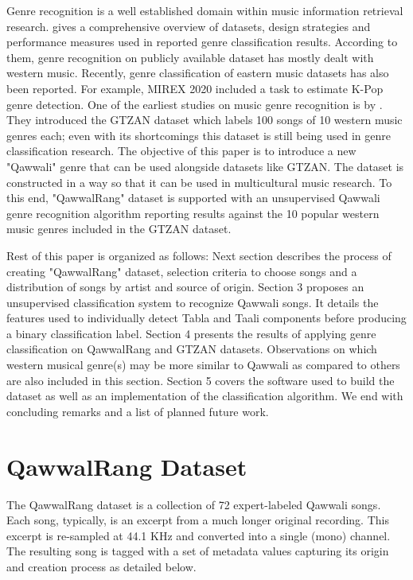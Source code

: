 \documentclass{article}
\begin{document}
Genre recognition is a well established domain within music information retrieval research. \cite{music_genre_survey} gives a comprehensive overview of datasets, design strategies and performance measures used in reported genre classification results. According to them, genre recognition on publicly available dataset has mostly dealt with western music. Recently, genre classification of eastern music datasets has also been reported. For example, MIREX 2020 \citep{mirex} included a task to estimate K-Pop genre detection. One of the earliest studies on music genre recognition is by \cite{gtzan}. They introduced the GTZAN dataset which labels 100 songs of 10 western music genres each; even with its shortcomings this dataset is still being used in genre classification research. The objective of this paper is to introduce a new "Qawwali" genre that can be used alongside datasets like GTZAN. The dataset is constructed in a way so that it can be used in multicultural music research. To this end, "QawwalRang" dataset is supported with an unsupervised Qawwali genre recognition algorithm reporting results against the 10 popular western music genres included in the GTZAN dataset.

Rest of this paper is organized as follows: Next section describes the process of creating "QawwalRang" dataset, selection criteria to choose songs and a distribution of songs by artist and source of origin. Section 3 proposes an unsupervised classification system to recognize Qawwali songs. It details the features used to individually detect Tabla and Taali components before producing a binary classification label. Section 4 presents the results of applying genre classification on QawwalRang and GTZAN datasets. Observations on which western musical genre(s) may be more similar to Qawwali as compared to others are also included in this section. Section 5 covers the software used to build the dataset as well as an implementation of the classification algorithm. We end with concluding remarks and a list of planned future work.

\section{QawwalRang Dataset}\label{sec:data}

The QawwalRang dataset is a collection of 72 expert-labeled Qawwali songs. Each song, typically, is an excerpt from a much longer original recording. This excerpt is re-sampled at 44.1 KHz and converted into a single (mono) channel. The resulting song is tagged with a set of metadata values capturing its origin and creation process as detailed below. 
\end{document}
